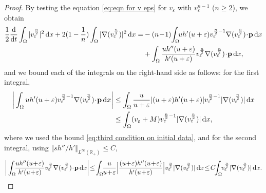 \documentclass[11pt,a4paper,reqno]{amsart}
\theoremstyle{remark}
\theoremstyle{definition}
\numberwithin{equation}{section}
\newcommand{\p}{{\bf p}}
\renewcommand{\d}{\, \mathrm{d} }
\newcommand{\der}{\mathrm{d}}
\begin{document}
\begin{proof}
    By testing the equation \eqref{eq:eqn for v eps} for $v_\varepsilon$ with $v_\varepsilon^{n-1}$ ($n \geq 2$), we obtain 
    \begin{equation}\label{eq:unif Linfty v eps computation}
       \begin{aligned} \frac{1}{2}\frac{\der}{\der t}\int_\Omega |v_\varepsilon^{\frac{n}{2}}|^2 \d x + 2(1 - \frac{1}{n}) \int_\Omega |\nabla (v_\varepsilon^{\frac{n}{2}}) |^2 \d x = &-(n\!-\!1) \! \int_\Omega \!\! u h'(u+\varepsilon) v_\varepsilon^{\frac{n}{2}-1} \nabla(v_\varepsilon^{\frac{n}{2}}) \! \cdot \! \p \d x \\ 
       &+ \int_\Omega \frac{u h''(u+\varepsilon)}{h'(u+\varepsilon)} v_\varepsilon^{\frac{n}{2}}\nabla(v_\varepsilon^{\frac{n}{2}}) \!\cdot\! \p \d x, 
       \end{aligned}
    \end{equation}
    and we bound each of the integrals on the right-hand side as follows: for the first integral, 
    \begin{equation*}
        \begin{aligned}
            \bigg|\int_\Omega u h'(u+\varepsilon) v_\varepsilon^{\frac{n}{2}-1} \nabla(v_\varepsilon^{\frac{n}{2}}) \! \cdot \! \p \d x \bigg| &\leq \int_\Omega \frac{u}{u+\varepsilon} |(u+\varepsilon) h'(u+\varepsilon) |v_\varepsilon^{\frac{n}{2}-1} |\nabla(v_\varepsilon^{\frac{n}{2}})| \d x\\ 
            &\leq \int_\Omega (v_\varepsilon+M) v_\varepsilon^{\frac{n}{2}-1} |\nabla(v_\varepsilon^{\frac{n}{2}})| \d x, 
        \end{aligned}
    \end{equation*}
    where we used the bound \eqref{eq:third condition on initial data}, and for the second integral, using $\Vert s h''/h' \Vert_{L^\infty(\mathbb{R}_+)} \leq C$, 
        \begin{equation*}
       \begin{aligned} 
      \bigg| \int_\Omega \!\!\frac{u h''(u\!+\!\varepsilon)}{h'(u\!+\!\varepsilon)} v_\varepsilon^{\frac{n}{2}}\nabla(v_\varepsilon^{\frac{n}{2}}) \!\cdot\! \p \d x \bigg| \!\leq\! \int_\Omega\!\! \frac{u}{u\!+\!\varepsilon} \Big|\frac{(u\!+\!\varepsilon) h''(u\!+\!\varepsilon)}{h'(u\!+\!\varepsilon)}\Big| v_\varepsilon^{\frac{n}{2}}|\nabla(v_\varepsilon^{\frac{n}{2}}) | \d x \!\leq \! C\!\! \int_\Omega\!\! v_\varepsilon^{\frac{n}{2}}|\nabla(v_\varepsilon^{\frac{n}{2}}) | \d x. 
       \end{aligned}
    \end{equation*}

\end{proof}
\end{document}

